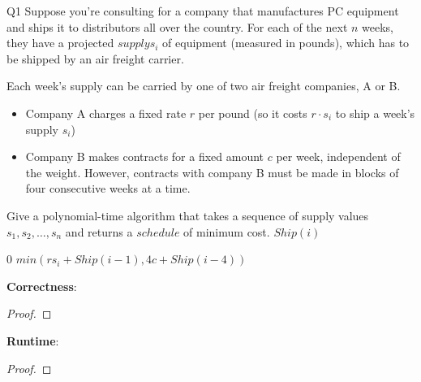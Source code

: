 \begin{problem}
  {Q1}
  Suppose you're consulting for a company that manufactures PC equipment and ships it to distributors all over the country.
  For each of the next $n$ weeks, they have a projected $supply s_i$ of equipment (measured in pounds), which has to be shipped
  by an air freight carrier.

  Each week's supply can be carried by one of two air freight companies, A or B.
  \begin{itemize}
    \item Company A charges a fixed rate $r$ per pound (so it costs $r \cdot s_i$ to ship a week's supply $s_i$)
    \item Company B makes contracts for a fixed amount $c$ per week, independent of the weight.
          However, contracts with company B must be made in blocks of four consecutive weeks at a time.
  \end{itemize}
  Give a polynomial-time algorithm that takes a sequence of supply values $s_1, s_2, \dots, s_n$ and returns a $schedule$ of minimum cost.
  $Ship(i)$
  \begin{algorithmic}[1]
      \RETURN $0$
      \ENDIF
      \RETURN $min(rs_i + Ship(i-1), 4c + Ship(i-4))$
  \end{algorithmic}
  \noindent
  \textbf{Correctness}:
  \begin{proof}
  \end{proof}
  \textbf{Runtime}:
  \begin{proof}
  \end{proof}
\end{problem}

